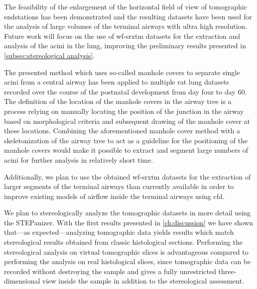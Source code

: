 The feasibility of the enlargement of the horizontal field of view of tomographic endstations has been demonstrated and the resulting datasets have been used for the analysis of large volumes of the terminal airways with ultra high resolution. Future work will focus on the use of \ac{wf-srxtm} datasets for the extraction and analysis of the acini in the lung, improving the preliminary results presented in \autoref{subsec:stereological analysis}.

The presented method which uses so-called manhole covers to separate single acini from a central airway has been applied to multiple rat lung datasets recorded over the course of the postnatal development from day four to day 60. The definition of the location of the manhole covers in the airway tree is a process relying on manually locating the position of the junction in the airway based on morphological criteria and subsequent drawing of the manhole cover at these locations. Combining the aforementioned manhole cover method with a skeletonization of the airway tree to act as a guideline for the positioning of the manhole covers would make it possible to extract and segment large numbers of acini for further analysis in relatively short time.

Additionally, we plan to use the obtained \ac{wf-srxtm} datasets for the extraction of larger segments of the terminal airways than currently available in order to improve existing models of airflow inside the terminal airways using \ac{cfd}. 

We plan to stereologically analyze the tomographic datasets in more detail using the STEPanizer. With the first results presented in \autoref{ch:discussion} we have shown that---as expected---analyzing tomographic data yields results which match stereological results obtained from classic histological sections. Performing the stereological analysis on virtual tomographic slices is advantageous compared to performing the analysis on real histological slices, since tomographic data can be recorded without destroying the sample and gives a fully unrestricted three-dimensional view inside the sample in addition to the stereological assessment.

